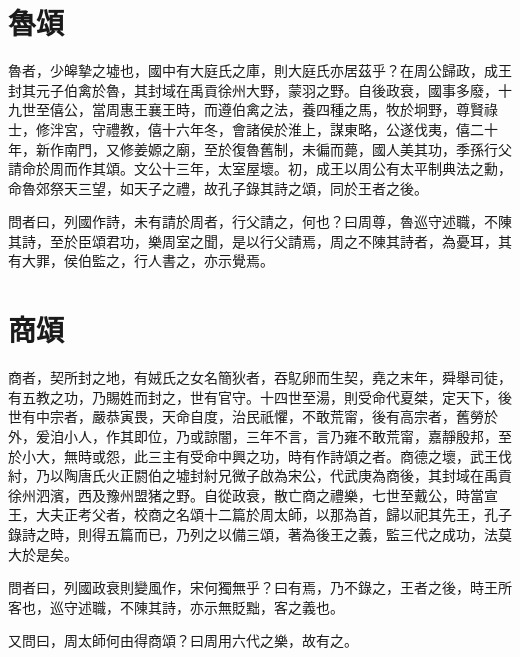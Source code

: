 \section*{魯頌}

魯者，少皞摯之墟也，國中有大庭氏之庫，則大庭氏亦居茲乎？在周公歸政，成王封其元子伯禽於魯，其封域在禹貢徐州大野，蒙羽之野。自後政衰，國事多廢，十九世至僖公，當周惠王襄王時，而遵伯禽之法，養四種之馬，牧於坰野，尊賢祿士，修泮宮，守禮教，僖十六年冬，會諸侯於淮上，謀東略，公遂伐夷，僖二十年，新作南門，又修姜嫄之廟，至於復魯舊制，未徧而薨，國人美其功，季孫行父請命於周而作其頌。文公十三年，太室屋壞。初，成王以周公有太平制典法之勳，命魯郊祭天三望，如天子之禮，故孔子錄其詩之頌，同於王者之後。

問者曰，列國作詩，未有請於周者，行父請之，何也？曰周尊，魯巡守述職，不陳其詩，至於臣頌君功，樂周室之聞，是以行父請焉，周之不陳其詩者，為憂耳，其有大罪，侯伯監之，行人書之，亦示覺焉。

\section*{商頌}

商者，契所封之地，有娀氏之女名簡狄者，吞鳦卵而生契，堯之末年，舜舉司徒，有五教之功，乃賜姓而封之，世有官守。十四世至湯，則受命代夏桀，定天下，後世有中宗者，嚴恭寅畏，天命自度，治民祇懼，不敢荒甯，後有高宗者，舊勞於外，爰洎小人，作其即位，乃或諒闇，三年不言，言乃雍不敢荒甯，嘉靜殷邦，至於小大，無時或怨，此三主有受命中興之功，時有作詩頌之者。商德之壞，武王伐紂，乃以陶唐氏火正閼伯之墟封紂兄微子啟為宋公，代武庚為商後，其封域在禹貢徐州泗濱，西及豫州盟猪之野。自從政衰，散亡商之禮樂，七世至戴公，時當宣王，大夫正考父者，校商之名頌十二篇於周太師，以那為首，歸以祀其先王，孔子錄詩之時，則得五篇而已，乃列之以備三頌，著為後王之義，監三代之成功，法莫大於是矣。

問者曰，列國政衰則變風作，宋何獨無乎？曰有焉，乃不錄之，王者之後，時王所客也，巡守述職，不陳其詩，亦示無貶黜，客之義也。

又問曰，周太師何由得商頌？曰周用六代之樂，故有之。